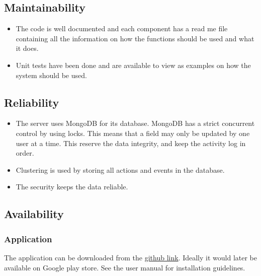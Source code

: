  \subsection{Maintainability}%
    \begin{itemize}
        \item The code is well documented and each component has a read me file containing all the information on how the functions should be used and what it does.
        \item Unit tests have been done and are available to view as examples on how the system should be used.
    \end{itemize}

 

\subsection{Reliability}%
\begin{itemize}
\item The server uses MongoDB for its database. MongoDB has a strict concurrent control by using locks. This means that a field may only be updated by one user at a time. This reserve the data integrity, and keep the activity log in order. 
\item Clustering is used by storing all actions and events in the database. 
\item The security keeps the data reliable.
\end{itemize}




\subsection{Availability}
\subsubsection{Application}
The application can be downloaded from the \href{https://github.com/Unsolvable-Solutions/Project-EPIC/tree/master/EPICProtectionApp/EPICAppFor4.4.2}{github link}. Ideally it would later be available on Google play store. See the user manual for installation guidelines.
